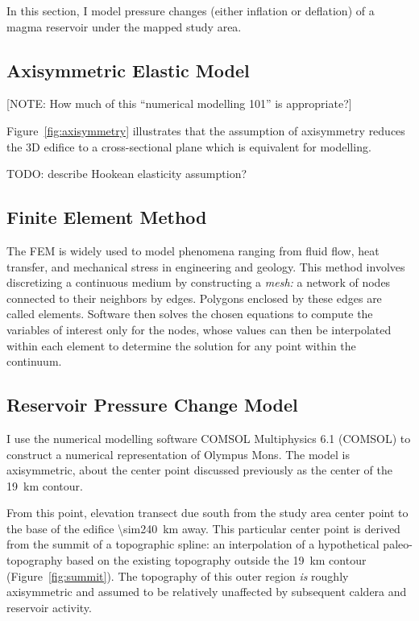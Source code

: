 In this section, I model pressure changes (either inflation or deflation) of a magma reservoir under the mapped study area.

\subsection{Axisymmetric Elastic Model}

[NOTE: How much of this ``numerical modelling 101'' is appropriate?] 

Figure~\ref{fig:axisymmetry} illustrates that the assumption of axisymmetry reduces the 3D edifice to a cross-sectional plane which is equivalent for modelling.

TODO: describe Hookean elasticity assumption?

\subsection{Finite Element Method}

The \ac{FEM} is widely used to model phenomena ranging from fluid flow, heat transfer, and mechanical stress in engineering and geology. This method involves discretizing a continuous medium by constructing a \emph{mesh:} a network of nodes connected to their neighbors by edges. Polygons enclosed by these edges are called elements. Software then solves the chosen equations to compute the variables of interest only for the nodes, whose values can then be interpolated within each element to determine the solution for any point within the continuum.

\subsection{Reservoir Pressure Change Model}

I use the numerical modelling software COMSOL Multiphysics 6.1 (COMSOL) to construct a numerical representation of Olympus Mons. The model is axisymmetric, about the center point discussed previously as the center of the \qty{19}{\km} contour.

From this point, elevation transect due south from the study area center point to the base of the edifice \qty{\sim240}{\km} away. This particular center point is derived from the summit of a topographic spline: an interpolation of a hypothetical paleo-topography based on the existing topography outside the \qty{19}{\km} contour (Figure~\ref{fig:summit}). The topography of this outer region \emph{is} roughly axisymmetric and assumed to be relatively unaffected by subsequent caldera and reservoir activity.

